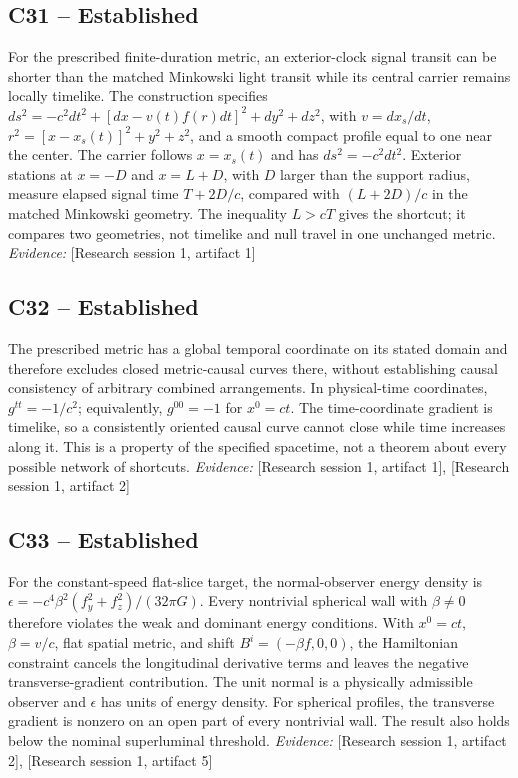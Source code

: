 \documentclass[11pt]{article}
\begin{document}
\begin{sloppypar}
\subsection{C31 -- Established}
For the prescribed finite-duration metric, an exterior-clock signal transit can be shorter than the matched Minkowski light transit while its central carrier remains locally timelike.
The construction specifies $ds^2=-c^2dt^2+[dx-v(t)f(r)dt]^2+dy^2+dz^2$, with $v=dx_s/dt$, $r^2=[x-x_s(t)]^2+y^2+z^2$, and a smooth compact profile equal to one near the center. The carrier follows $x=x_s(t)$ and has $ds^2=-c^2dt^2$. Exterior stations at $x=-D$ and $x=L+D$, with $D$ larger than the support radius, measure elapsed signal time $T+2D/c$, compared with $(L+2D)/c$ in the matched Minkowski geometry. The inequality $L>cT$ gives the shortcut; it compares two geometries, not timelike and null travel in one unchanged metric.
\textit{Evidence: }[Research session 1, artifact 1]
\subsection{C32 -- Established}
The prescribed metric has a global temporal coordinate on its stated domain and therefore excludes closed metric-causal curves there, without establishing causal consistency of arbitrary combined arrangements.
In physical-time coordinates, $g^{tt}=-1/c^2$; equivalently, $g^{00}=-1$ for $x^0=ct$. The time-coordinate gradient is timelike, so a consistently oriented causal curve cannot close while time increases along it. This is a property of the specified spacetime, not a theorem about every possible network of shortcuts.
\textit{Evidence: }[Research session 1, artifact 1], [Research session 1, artifact 2]
\subsection{C33 -- Established}
For the constant-speed flat-slice target, the normal-observer energy density is $\epsilon=-c^4\beta^2(f_y^2+f_z^2)/(32\pi G)$. Every nontrivial spherical wall with $\beta\neq0$ therefore violates the weak and dominant energy conditions.
With $x^0=ct$, $\beta=v/c$, flat spatial metric, and shift $B^i=(-\beta f,0,0)$, the Hamiltonian constraint cancels the longitudinal derivative terms and leaves the negative transverse-gradient contribution. The unit normal is a physically admissible observer and $\epsilon$ has units of energy density. For spherical profiles, the transverse gradient is nonzero on an open part of every nontrivial wall. The result also holds below the nominal superluminal threshold.
\textit{Evidence: }[Research session 1, artifact 2], [Research session 1, artifact 5]

\end{sloppypar}
\end{document}
